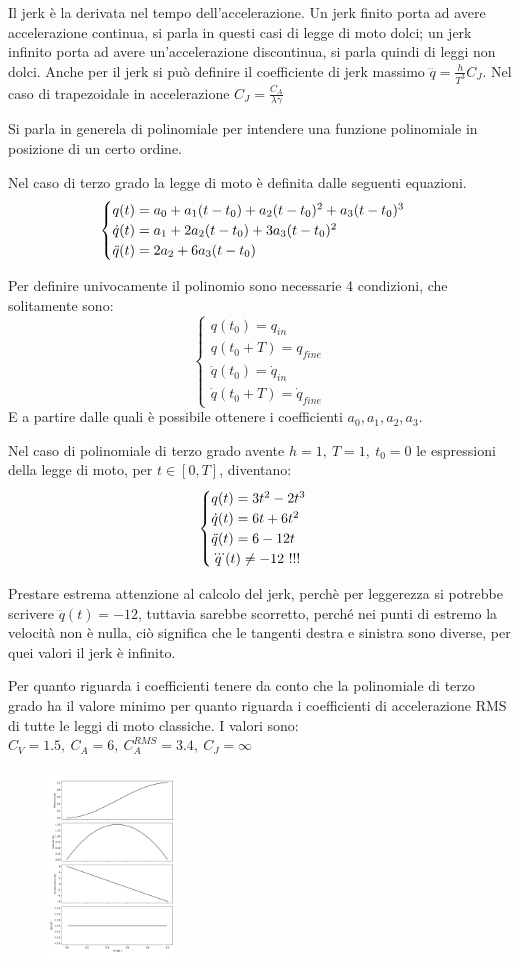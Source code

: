 Il jerk è la derivata nel tempo dell'accelerazione. Un jerk finito porta ad avere accelerazione continua, si parla in questi casi di legge di moto dolci; un jerk infinito porta ad avere un'accelerazione discontinua, si parla quindi di leggi non dolci.
Anche per il jerk si può definire il coefficiente di jerk massimo \(\dddot{q} = \frac{h}{T^3}C_J\).
Nel caso di trapezoidale in accelerazione \(C_J = \frac{C_A}{\lambda \gamma}\)

Si parla in generela di polinomiale per intendere una funzione polinomiale in posizione di un certo ordine.

Nel caso di terzo grado la legge di moto è definita dalle seguenti equazioni.
\[\begin{cases}
    q(t) = a_0 + a_1 (t-t_0) + a_2 (t-t_0)^2 + a_3 (t-t_0)^3 \\
    \dot{q}(t) = a_1 + 2 a_2 (t-t_0) + 3 a_3 (t-t_0)^2 \\
    \Ddot{q}(t) = 2 a_2 + 6 a_3 (t-t_0)
\end{cases}\]

Per definire univocamente il polinomio sono necessarie 4 condizioni, che solitamente sono:
\[\begin{cases}
    q(t_0) = q_{in}  \\
    q(t_0+T) = q_{fine}  \\
    \dot{q}(t_0) = \dot{q}_{in}  \\
    \dot{q}(t_0+T) = \dot{q}_{fine}  
\end{cases}\]
E a partire dalle quali è possibile ottenere i coefficienti \(a_0,a_1,a_2,a_3\).

Nel caso di polinomiale di terzo grado avente \(h=1, \ T=1, \ t_0=0\) le espressioni della legge di moto, per \(t\in[0,T]\), diventano:
\[\begin{cases}
    q(t) = 3 t^2 - 2 t^3 \\
    \dot{q}(t) = 6 t + 6 t^2 \\
    \Ddot{q}(t) = 6 - 12 t \\
    \dddot{q}(t) \neq -12 \ !!!
\end{cases}\]

Prestare estrema attenzione al calcolo del jerk, perchè per leggerezza si potrebbe scrivere \(\dddot{q}(t) = -12\), tuttavia sarebbe scorretto, perché nei punti di estremo la velocità non è nulla, ciò significa che le tangenti destra e sinistra sono diverse, per quei valori il jerk è infinito.

Per quanto riguarda i coefficienti tenere da conto che la polinomiale di terzo grado ha il valore minimo per quanto riguarda i coefficienti di accelerazione RMS di tutte le leggi di moto classiche. I valori sono: \(C_V=1.5, \ C_A = 6, \ C_A^{RMS}=3.4, \ C_J = \infty\)

\begin{figure}[h]
    \centering
    \includegraphics[width=0.3\textwidth]{Immagini/polinom_terzo_grado.png}
\end{figure}